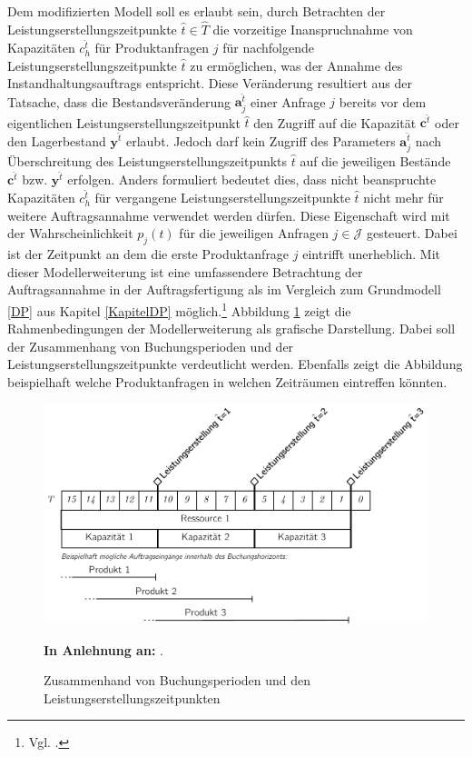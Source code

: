 Dem modifizierten Modell soll es erlaubt sein, durch Betrachten der Leistungserstellungszeitpunkte $\hat t \in \hat T$ die vorzeitige Inanspruchnahme von Kapazitäten $c_{h}^{\hat t}$ für Produktanfragen $j$ für nachfolgende Leistungserstellungszeitpunkte $\hat{t}$ zu ermöglichen, was der Annahme des Instandhaltungsauftrags entspricht. Diese Veränderung resultiert aus der Tatsache, dass die Bestandsveränderung $\textbf{a}_j^{\hat t}$ einer Anfrage $j$ bereits vor dem eigentlichen Leistungserstellungszeitpunkt $\hat t$ den Zugriff auf die Kapazität $\textbf{c}^{\hat t}$ oder den Lagerbestand $\textbf{y}^{\hat t}$ erlaubt. Jedoch darf kein Zugriff des Parameters $\textbf{a}_j^{\hat t}$ nach Überschreitung des Leistungserstellungszeitpunkts $\hat t$ auf die jeweiligen Bestände $\textbf{c}^{\hat t}$ bzw. $\textbf{y}^{\hat t}$ erfolgen. Anders formuliert bedeutet dies, dass nicht beanspruchte Kapazitäten $c_{h}^{\hat t}$ für vergangene Leistungserstellungszeitpunkte $\hat t$ nicht mehr für weitere Auftragsannahme verwendet werden dürfen. Diese Eigenschaft wird mit der Wahrscheinlichkeit $p_j(t)$ für die jeweiligen Anfragen $j\in\mathcal{J}$ gesteuert. Dabei ist der Zeitpunkt an dem die erste Produktanfrage $j$ eintrifft unerheblich. Mit dieser Modellerweiterung ist eine umfassendere Betrachtung der Auftragsannahme in der Auftragsfertigung als im Vergleich zum Grundmodell \ref{DP} aus Kapitel \ref{KapitelDP} möglich.\footnote{Vgl. \cite{lars}.} Abbildung \ref{LP2} zeigt die Rahmenbedingungen der Modellerweiterung als grafische Darstellung. Dabei soll der Zusammenhang von Buchungsperioden und der Leistungserstellungszeitpunkte verdeutlicht werden. Ebenfalls zeigt die Abbildung beispielhaft welche Produktanfragen in welchen Zeiträumen eintreffen könnten.

\begin{figure}[h!]
  \begin{center}
    \includegraphics[width=130mm]{Bilder/Leistungsperioden2.pdf}
    \caption{Zusammenhand von Buchungsperioden und den Leistungserstellungszeitpunkten}  \label{LP2}
    {\footnotesize \textbf{In Anlehnung an:} \cite{lars}}. 
  \end{center}
\end{figure}



